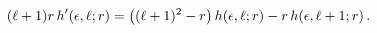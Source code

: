 \[(\ell+1)r\mathop{h\/}\nolimits'\!\left(\epsilon,\ell;r\right)=\left((\ell+1)^{%
2}-r\right)\mathop{h\/}\nolimits\!\left(\epsilon,\ell;r\right)-r\mathop{h\/}%
\nolimits\!\left(\epsilon,\ell+1;r\right).\]